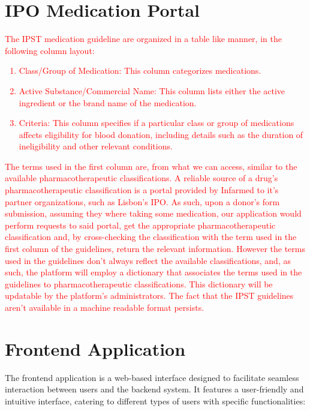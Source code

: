 \section{IPO Medication Portal}
\textcolor{red}{
The IPST medication guideline are organized in a table like manner, in the following column layout:
	\begin{enumerate}
		\item Class/Group of Medication: This column categorizes medications.
		\item Active Substance/Commercial Name: This column lists either the active ingredient or the brand name of the medication.
		\item Criteria: This column specifies if a particular class or group of medications affects eligibility for blood donation, including details such as the duration of ineligibility and other relevant conditions.
	\end{enumerate}
	The terms used in the first column are, from what we can access, similar to the available pharmacotherapeutic classifications. A reliable source of a drug's pharmacotherapeutic classification is a portal provided by Infarmed to it's partner organizations, such as Lisbon's IPO.
	As such, upon a donor's form submission, assuming they where taking some medication, our application would perform requests to said portal, get the appropriate pharmacotherapeutic classification and, by cross-checking the classification with the term used in the first column of the guidelines, return the relevant information.
	However the terms used in the guidelines don't always reflect the available classifications, and, as such, the platform will employ a dictionary that associates the terms used in the guidelines to pharmacotherapeutic classifications. This dictionary will be updatable by the platform's administrators.
	The fact that the IPST guidelines aren't available in a machine readable format persists.
}

\section{Frontend Application}\label{architecture_frontend}

The frontend application is a web-based interface designed to facilitate seamless interaction between users and the backend system. It features a user-friendly and intuitive interface, catering to different types of users with specific functionalities:

